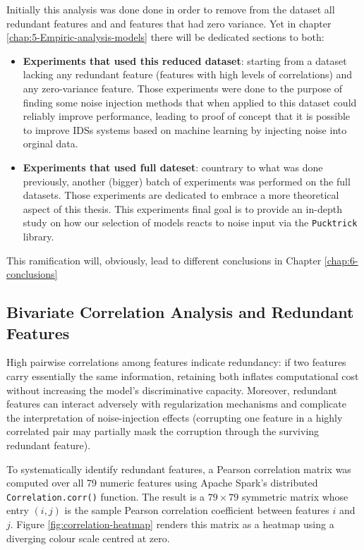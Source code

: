 \documentclass[../main.tex]{subfiles}
\begin{document}
Initially this analysis was done done in order to remove from the dataset all redundant features and and features that had zero variance. Yet in chapter \ref{chap:5-Empiric-analysis-models} there will be dedicated sections to both:
\begin{itemize}
    \item {} \textbf{Experiments that used this reduced dataset}: starting from a dataset lacking any redundant feature (features with high levels of correlations) and any zero-variance feature. Those experiments were done to the purpose of finding some noise injection methods that when applied to this dataset could reliably improve performance, leading to proof of concept that it is possible to improve IDSs systems based on machine learning by injecting noise into orginal data. 
    \item {} \textbf{Experiments that used full dateset}: countrary to what was done previously, another (bigger) batch of experiments was performed on the full datasets. Those experiments are dedicated to embrace a more theoretical aspect of this thesis. This experiments final goal is to provide an in-depth study on how our selection of models reacts to noise input via the \texttt{Pucktrick} library.
\end{itemize}

This ramification will, obviously, lead to different conclusions in Chapter \ref{chap:6-conclusions}

\subsection{Bivariate Correlation Analysis and Redundant Features}
\label{sec:corr-analysis}

High pairwise correlations among features indicate redundancy: if two features carry essentially the same information, retaining both inflates computational cost without increasing the model's discriminative capacity.  Moreover, redundant features can interact adversely with regularization mechanisms and complicate the interpretation of noise-injection effects (corrupting one feature in a highly correlated pair may partially mask the corruption through the surviving redundant feature).

To systematically identify redundant features, a Pearson correlation matrix was computed over all 79 numeric features using Apache Spark's distributed \texttt{Correlation.corr()} function.  The result is a $79 \times 79$ symmetric matrix whose entry $(i,j)$ is the sample Pearson correlation coefficient between features $i$ and $j$.  Figure \ref{fig:correlation-heatmap} renders this matrix
as a heatmap using a diverging colour scale centred at zero.
\end{document}
